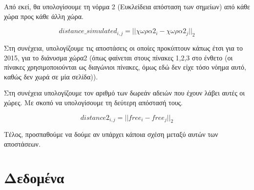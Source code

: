 \documentclass[a4paper,twoside,10pt]{article}
\begin{document}
	Από εκεί, θα υπολογίσουμε τη νόρμα 2 (Ευκλείδεια απόσταση των σημείων) από κάθε χώρα προς κάθε άλλη χώρα. 
	
	$$
	distance\_simulated_{i,j}= ||\chi \omega \rho \alpha2 _i - \chi \omega \rho \alpha2_j||_2$$
	
	Στη συνέχεια, υπολογίζουμε τις αποστάσεις οι οποίες προκύπτουν κάπως έτσι για το 2015, για το διάνυσμα χώρα2 (όπως φαίνεται στους πίνακες 1,2,3 στο ένθετο (οι πίνακες χρησιμοποιούνται ως διαγώνιοι πίνακες, όμως εδώ δεν είχε τόσο νόημα αυτό, καθώς δεν χωρά σε μία σελίδα)).
	
	
	Στη συνέχεια υπολογίζουμε τον αριθμό των δωρεάν αδειών που έχουν λάβει αυτές οι χώρες. Με σκοπό να υπολογίσουμε τη δεύτερη απόστασή τους.
	
	$$distance2_{i,j} = || free_i - free_j||_2
	$$
	
	Τέλος, προσπαθούμε να δούμε αν υπάρχει κάποια σχέση μεταξύ αυτών των αποστάσεων.
	
	\section{Δεδομένα}
\end{document}

